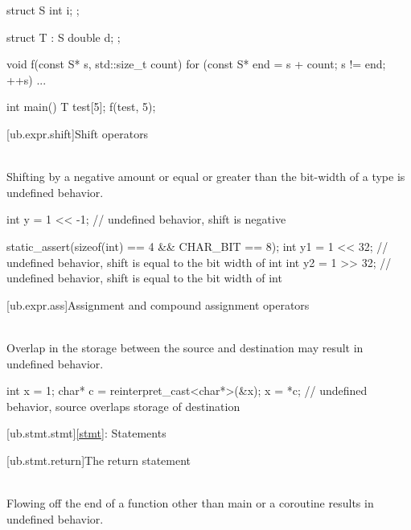 \pnum
\begin{example}
\begin{codeblock}
struct S {
  int i;
};

struct T : S {
  double d;
};

void f(const S* s, std::size_t count) {
  for (const S* end = s + count; s != end; ++s) {
    ...
  }
}

int main() {
  T test[5];
  f(test, 5);
}
\end{codeblock}
\end{example}


[ub.expr.shift]{Shift operators}

\pnum
{} \\
Shifting by a negative amount or equal or greater than the bit-width of a type is undefined behavior.

\pnum
\begin{example}
\begin{codeblock}
int y = 1 << -1;        // undefined behavior, shift is negative

static_assert(sizeof(int) == 4 && CHAR_BIT == 8);
int y1 = 1 << 32;       // undefined behavior, shift is equal to the bit width of int
int y2 = 1 >> 32;       // undefined behavior, shift is equal to the bit width of int
\end{codeblock}
\end{example}


[ub.expr.ass]{Assignment and compound assignment operators}

\pnum
{} \\
Overlap in the storage between the source and destination may result in undefined behavior.

\pnum
\begin{example}
\begin{codeblock}
int x = 1;
char* c = reinterpret_cast<char*>(&x);
x = *c;         // undefined behavior, source overlaps storage of destination
\end{codeblock}
\end{example}

[ub.stmt.stmt]{\ref{stmt}: Statements}

[ub.stmt.return]{The return statement}

\pnum
{} \\
Flowing off the end of a function other
than main or a coroutine results in undefined behavior.


